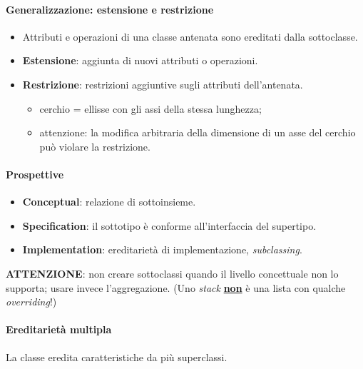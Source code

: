 \documentclass[a4paper,12pt]{article}
\begin{document}
\paragraph{Generalizzazione: estensione e restrizione}
\begin{itemize}
  \item Attributi e operazioni di una classe antenata sono ereditati dalla sottoclasse.
  \item \textbf{Estensione}: aggiunta di nuovi attributi o operazioni.
  \item \textbf{Restrizione}: restrizioni aggiuntive sugli attributi dell'antenata.
  \begin{itemize}
    \item cerchio = ellisse con gli assi della stessa lunghezza;
    \item attenzione: la modifica arbitraria della dimensione di un asse del cerchio può
          violare la restrizione.
  \end{itemize}
\end{itemize}
\paragraph{Prospettive}
\begin{itemize}
  \item \textbf{Conceptual}: relazione di sottoinsieme.
  \item \textbf{Specification}: il sottotipo è conforme all'interfaccia del supertipo.
  \item \textbf{Implementation}: ereditarietà di implementazione, \emph{subclassing}.
\end{itemize}
{\color{magenta}\textbf{ATTENZIONE}}: non creare sottoclassi quando il livello concettuale
non lo supporta; usare invece l'aggregazione. (Uno \emph{stack} \underline{\textbf{\color{red}non}}
è una lista con qualche \emph{overriding}!)
\paragraph{Ereditarietà multipla} La classe eredita caratteristiche da più superclassi.
\begin{center}
\end{center}
\end{document}
